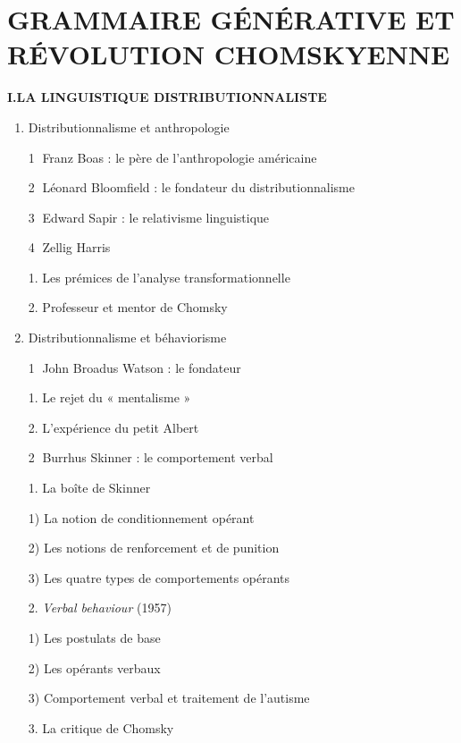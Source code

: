 \chapter{GRAMMAIRE GÉNÉRATIVE ET RÉVOLUTION CHOMSKYENNE}
\label{chapter-14}
\begin{keybox}
\small{}
\textbf{I.\quad LA LINGUISTIQUE DISTRIBUTIONNALISTE}
\begin{enumerate}[label=\arabic*.]
\item Distributionnalisme et anthropologie\par
\textcircled{\scriptsize 1} Franz Boas : le père de l’anthropologie américaine\par
\textcircled{\scriptsize 2} Léonard Bloomfield : le fondateur du distributionnalisme\par
\textcircled{\scriptsize 3} Edward Sapir : le relativisme linguistique\par
\textcircled{\scriptsize 4} Zellig Harris\par\hspace*{1em}1. Les prémices de l’analyse transformationnelle\par\hspace*{1em}2. Professeur et mentor de Chomsky
\item Distributionnalisme et béhaviorisme\par
\textcircled{\scriptsize 1} John Broadus Watson : le fondateur\par\hspace*{1em}1. Le rejet du « mentalisme »\par\hspace*{1em}2. L’expérience du petit Albert\par
\textcircled{\scriptsize 2} Burrhus Skinner : le comportement verbal\par\hspace*{1em}1. La boîte de Skinner\par\hspace*{2em}1) La notion de conditionnement opérant\par\hspace*{2em}2) Les notions de renforcement et de punition\par\hspace*{2em}3) Les quatre types de comportements opérants\par\hspace*{1em}2. \textit{Verbal behaviour} (1957)\par\hspace*{2em}1) Les postulats de base\par\hspace*{2em}2) Les opérants verbaux\par\hspace*{2em}3) Comportement verbal et traitement de l’autisme\par\hspace*{1em}3. La critique de Chomsky

\end{enumerate}
\end{keybox}
